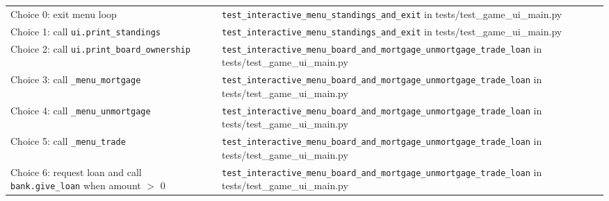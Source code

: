 \documentclass[11pt]{article}
\begin{document}
\begin{longtable}{>{\raggedright\arraybackslash}p{} >{\raggedright\arraybackslash}p{}}
\multicolumn{2}{l}{\textbf{moneypoly.game: interactive\_menu}} \\ \hline
Choice 0: exit menu loop & \texttt{test\_interactive\_menu\_standings\_and\_exit} in tests/test\_game\_ui\_main.py \\ \hline
Choice 1: call \texttt{ui.print\_standings} & \texttt{test\_interactive\_menu\_standings\_and\_exit} in tests/test\_game\_ui\_main.py \\ \hline
Choice 2: call \texttt{ui.print\_board\_ownership} & \texttt{test\_interactive\_menu\_board\_and\_mortgage\_unmortgage\_trade\_loan} in tests/test\_game\_ui\_main.py \\ \hline
Choice 3: call \texttt{\_menu\_mortgage} & \texttt{test\_interactive\_menu\_board\_and\_mortgage\_unmortgage\_trade\_loan} in tests/test\_game\_ui\_main.py \\ \hline
Choice 4: call \texttt{\_menu\_unmortgage} & \texttt{test\_interactive\_menu\_board\_and\_mortgage\_unmortgage\_trade\_loan} in tests/test\_game\_ui\_main.py \\ \hline
Choice 5: call \texttt{\_menu\_trade} & \texttt{test\_interactive\_menu\_board\_and\_mortgage\_unmortgage\_trade\_loan} in tests/test\_game\_ui\_main.py \\ \hline
Choice 6: request loan and call \texttt{bank.give\_loan} when amount $>$ 0 & \texttt{test\_interactive\_menu\_board\_and\_mortgage\_unmortgage\_trade\_loan} in tests/test\_game\_ui\_main.py \\ \hline


\end{longtable}
\end{document}

